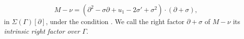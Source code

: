 \documentclass[a4paper,12pt]{article}
\begin{document}
{\begin{equation*}\label{eq-intrinsic-rfactor}
    M-\nu = \left(\partial^2 -\sigma\partial+
    u_1 -2\sigma' 
    +\sigma^2 
    \right)\cdot (\partial +\sigma ) ,
\end{equation*}
in  $\Sigma(\Gamma)[\partial ]$, under the condition
. 
We call the right factor $\partial +\sigma  $ of $M-\nu$ its {\sl intrinsic right factor over $\Gamma$}.










%

}
\end{document}
